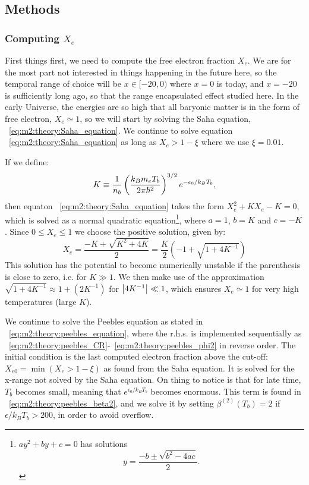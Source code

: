 \subsection{Methods}\label{sec:m2:methods}

\subsubsection{Computing $X_e$}\label{sec:m2:methods:electron_fraction}
    First things first, we need to compute the free electron fraction $X_e$. We are for the most part not interested in things happening in the future here, so the temporal range of choice will be $x\in[-20,0)$ where $x=0$ is today, and $x=-20$ is sufficiently long ago, so that the range encapsulated effect studied here. In the early Universe, the energies are so high that all baryonic matter is in the form of free electron, $X_e\simeq1$, so we will start by solving the Saha equation, ~\cref{eq:m2:theory:Saha_equation}. We continue to solve equation ~\cref{eq:m2:theory:Saha_equation} as long as $X_e>1-\xi$ where we use $\xi=0.01$.

    If we define:
    \begin{equation}
        K \equiv \frac{1}{n_b}\left(\frac{k_Bm_eT_b}{2\pi\hbar^2}\right)^{3/2}e^{-\epsilon_0/k_BT_b},
    \end{equation}
    then equaton ~\cref{eq:m2:theory:Saha_equation} takes the form $X_e^2 + KX_e - K = 0$, which is solved as a normal quadratic equation\footnote{$ay^2+by+c=0$ has solutions $$y=\frac{-b\pm\sqrt{b^2-4ac}}{2}.$$}, where $a=1$, $b=K$ and $c=-K$. Since $0\leq X_e\leq1$ we choose the positive solution, given by:
    \begin{equation}\label{eq:m2:methods:sqrt_approx}
        X_e = \frac{-K+\sqrt{K^2+4K}}{2} = \frac{K}{2}\left(-1+\sqrt{1+4K^{-1}}\right)
    \end{equation}
    This solution has the potential to become numerically unstable if the parenthesis is close to zero, i.e. for $K\gg1$. We then make use of the approximation $\sqrt{1+4K^{-1}} \approx 1+(2K^{-1})$ for $\abs{4K^{-1}}\ll1$, which ensures $X_e\simeq1$ for very high temperatures (large $K$).


    We continue to solve the Peebles equation as stated in ~\cref{eq:m2:theory:peebles_equation}, where the r.h.s. is implemented sequentially as ~\cref{eq:m2:theory:peebles_CR}-~\cref{eq:m2:theory:peebles_phi2} in reverse order. The initial condition is the last computed electron fraction above the cut-off: $X_{e0}=\min(X_e>1-\xi)$ as found from the Saha equation. It is solved for the x-range not solved by the Saha equation. On thing to notice is that for late time, $T_b$ becomes small, meaning that $e^{\epsilon_0/k_BT_b}$ becomes enormous. This term is found in ~\cref{eq:m2:theory:peebles_beta2}, and we solve it by setting $\beta^{(2)}(T_b)=2$ if $\epsilon/k_BT_b > 200$, in order to avoid overflow. 

